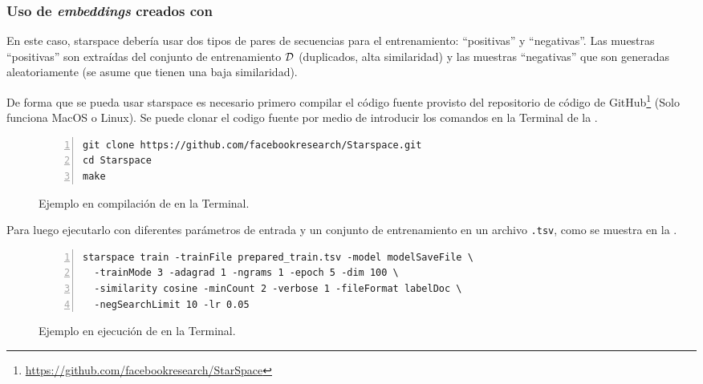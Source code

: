 \subsubsection{Uso de \emph{embeddings} creados con }
En este caso, \gls{starspace} debería usar dos tipos de pares de secuencias para el entrenamiento: ``positivas'' y ``negativas''. Las muestras ``positivas'' son extraídas del conjunto de entrenamiento $\mathcal{D}$ (duplicados, alta similaridad) y las muestras ``negativas'' que son generadas aleatoriamente (se asume que tienen una baja similaridad).

De forma que se pueda usar \gls{starspace} es necesario primero compilar el código fuente provisto del repositorio de código de GitHub\footnote{\href{https://github.com/facebookresearch/StarSpace}{https://github.com/facebookresearch/StarSpace}} (Solo funciona MacOS o Linux). Se puede clonar el codigo fuente por medio de introducir los  comandos en la Terminal de la .

\begin{figure}[ht]
\centering
\begin{minipage}{0.9\textwidth}
\begin{Verbatim}[fontsize=\footnotesize,numbers=left,numbersep=2pt]
git clone https://github.com/facebookresearch/Starspace.git
cd Starspace
make
\end{Verbatim}
\end{minipage}
\caption{Ejemplo en compilación de  en la Terminal.} 
\label{fig:starspace-terminal-compilation}
\end{figure}

Para luego ejecutarlo con diferentes parámetros de entrada y un conjunto de entrenamiento en un archivo \texttt{.tsv}, como se muestra en la .

\begin{figure}[ht]
\centering
\begin{minipage}{0.9\textwidth}
\begin{Verbatim}[fontsize=\footnotesize,numbers=left,numbersep=2pt]
starspace train -trainFile prepared_train.tsv -model modelSaveFile \
  -trainMode 3 -adagrad 1 -ngrams 1 -epoch 5 -dim 100 \
  -similarity cosine -minCount 2 -verbose 1 -fileFormat labelDoc \
  -negSearchLimit 10 -lr 0.05
\end{Verbatim}
\end{minipage}
\caption{Ejemplo en ejecución de  en la Terminal.} 
\label{fig:starspace-terminal-execution}
\end{figure}

